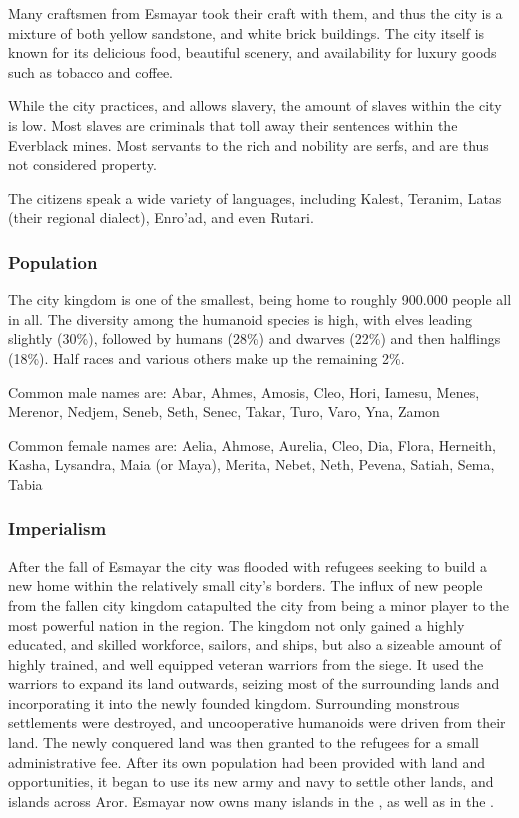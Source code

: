 Many craftsmen from Esmayar took their craft with them, and thus the city is a
mixture of both yellow sandstone, and white brick buildings. The city itself
is known for its delicious food, beautiful scenery, and availability for
luxury goods such as tobacco and coffee.

While the city practices, and allows slavery, the amount of slaves within the
city is low. Most slaves are criminals that toll away their sentences within
the Everblack mines. Most servants to the rich and nobility are serfs, and are
thus not considered property.

The citizens speak a wide variety of languages, including Kalest, Teranim,
Latas (their regional dialect), Enro'ad, and even Rutari.

\subsubsection{Population}

The city kingdom is one of the smallest, being home to roughly 900.000
people all in all. The diversity among the humanoid species is high, with
elves leading slightly (30\%), followed by humans (28\%) and dwarves (22\%)
and then halflings (18\%). Half races and various others make up the remaining
2\%.

Common male names are: Abar, Ahmes, Amosis, Cleo, Hori, Iamesu, Menes,
Merenor, Nedjem, Seneb, Seth, Senec, Takar, Turo, Varo, Yna, Zamon

Common female names are: Aelia, Ahmose, Aurelia, Cleo, Dia, Flora, Herneith,
Kasha, Lysandra, Maia (or Maya), Merita, Nebet, Neth, Pevena, Satiah, Sema,
Tabia

\subsubsection{Imperialism}

After the fall of Esmayar the city was flooded with refugees seeking to build
a new home within the relatively small city's borders. The influx of new
people from the fallen city kingdom catapulted the city from being a minor
player to the most powerful nation in the region. The kingdom not only gained
a highly educated, and skilled workforce, sailors, and ships, but also a
sizeable amount of highly trained, and well equipped veteran warriors from the
siege. It used the warriors to expand its land outwards, seizing most of the
surrounding lands and incorporating it into the newly founded
kingdom. Surrounding monstrous settlements were destroyed, and uncooperative
humanoids were driven from their land. The newly conquered land was then
granted to the refugees for a small administrative fee. After its own
population had been provided with land and opportunities, it began to use its
new army and navy to settle other lands, and islands across Aror. Esmayar now
owns many islands in the , as well as in the
.

